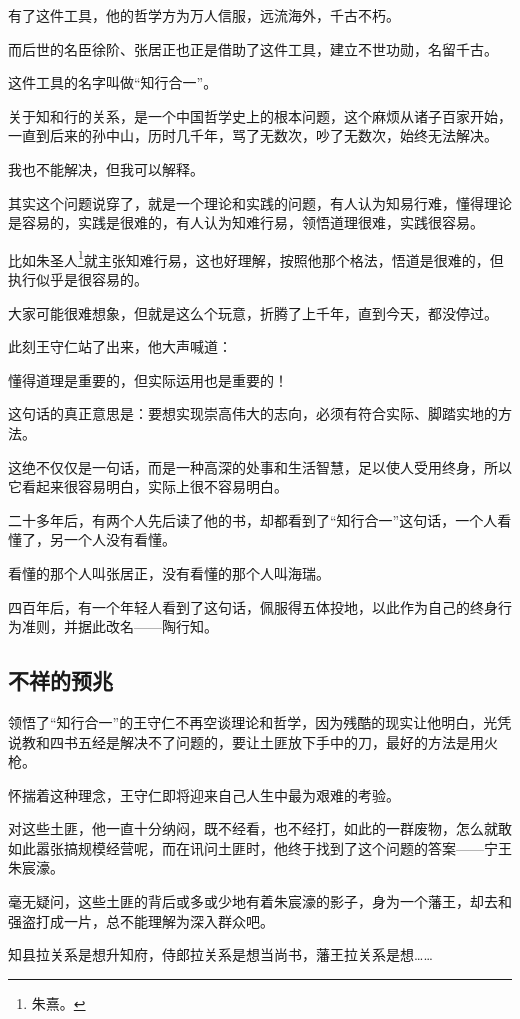 \begin{multicols}{\theparacolNo}
有了这件工具，他的哲学方为万人信服，远流海外，千古不朽。

而后世的名臣徐阶、张居正也正是借助了这件工具，建立不世功勋，名留千古。

这件工具的名字叫做“知行合一”。

关于知和行的关系，是一个中国哲学史上的根本问题，这个麻烦从诸子百家开始，一直到后来的孙中山，历时几千年，骂了无数次，吵了无数次，始终无法解决。

我也不能解决，但我可以解释。

其实这个问题说穿了，就是一个理论和实践的问题，有人认为知易行难，懂得理论是容易的，实践是很难的，有人认为知难行易，领悟道理很难，实践很容易。

比如朱圣人\footnote{朱熹。}就主张知难行易，这也好理解，按照他那个格法，悟道是很难的，但执行似乎是很容易的。

大家可能很难想象，但就是这么个玩意，折腾了上千年，直到今天，都没停过。

此刻王守仁站了出来，他大声喊道：

懂得道理是重要的，但实际运用也是重要的！

这句话的真正意思是：要想实现崇高伟大的志向，必须有符合实际、脚踏实地的方法。

这绝不仅仅是一句话，而是一种高深的处事和生活智慧，足以使人受用终身，所以它看起来很容易明白，实际上很不容易明白。

二十多年后，有两个人先后读了他的书，却都看到了“知行合一”这句话，一个人看懂了，另一个人没有看懂。

看懂的那个人叫张居正，没有看懂的那个人叫海瑞。

四百年后，有一个年轻人看到了这句话，佩服得五体投地，以此作为自己的终身行为准则，并据此改名——陶行知。

\subsection{不祥的预兆}
领悟了“知行合一”的王守仁不再空谈理论和哲学，因为残酷的现实让他明白，光凭说教和四书五经是解决不了问题的，要让土匪放下手中的刀，最好的方法是用火枪。

怀揣着这种理念，王守仁即将迎来自己人生中最为艰难的考验。

对这些土匪，他一直十分纳闷，既不经看，也不经打，如此的一群废物，怎么就敢如此嚣张搞规模经营呢，而在讯问土匪时，他终于找到了这个问题的答案——宁王朱宸濠。

毫无疑问，这些土匪的背后或多或少地有着朱宸濠的影子，身为一个藩王，却去和强盗打成一片，总不能理解为深入群众吧。

知县拉关系是想升知府，侍郎拉关系是想当尚书，藩王拉关系是想……


\end{multicols}
